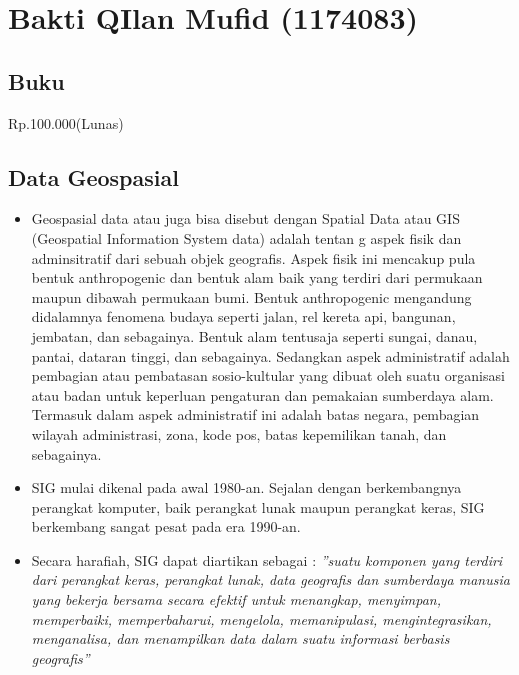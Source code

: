 \section{Bakti QIlan Mufid (1174083)}
\subsection{Buku}
Rp.100.000(Lunas)
\subsection{Data Geospasial}
\begin{itemize}
\item Geospasial data atau juga bisa disebut dengan Spatial Data atau GIS (Geospatial Information System data) adalah tentan g aspek fisik dan adminsitratif dari sebuah objek geografis. Aspek fisik ini mencakup pula bentuk anthropogenic dan bentuk alam baik yang terdiri dari permukaan maupun dibawah permukaan bumi. Bentuk anthropogenic mengandung didalamnya fenomena budaya seperti jalan, rel kereta api, bangunan, jembatan, dan sebagainya. Bentuk alam tentusaja seperti sungai, danau, pantai, dataran tinggi, dan sebagainya. Sedangkan aspek administratif adalah pembagian atau pembatasan sosio-kultular yang dibuat oleh suatu organisasi atau badan untuk keperluan pengaturan dan pemakaian sumberdaya alam. Termasuk dalam aspek administratif ini adalah batas negara, pembagian wilayah administrasi, zona, kode pos, batas kepemilikan tanah, dan sebagainya.

\item SIG mulai dikenal pada awal 1980-an. Sejalan dengan berkembangnya perangkat komputer, baik perangkat lunak maupun perangkat keras, SIG berkembang sangat pesat pada era 1990-an.

\item Secara harafiah, SIG dapat diartikan sebagai : \textit{”suatu komponen yang terdiri dari perangkat keras, perangkat lunak, data geografis dan sumberdaya manusia yang bekerja bersama secara efektif untuk menangkap, menyimpan, memperbaiki, memperbaharui, mengelola, memanipulasi, mengintegrasikan, menganalisa, dan menampilkan data dalam suatu informasi berbasis geografis”} 


\end{itemize}
